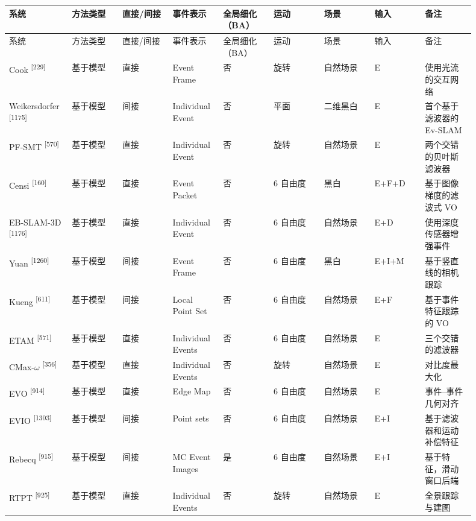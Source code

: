 \scriptsize
\setlength{\tabcolsep}{2pt}
\begin{longtable}{p{0.100\linewidth}p{0.100\linewidth}p{0.100\linewidth}p{0.100\linewidth}p{0.100\linewidth}p{0.100\linewidth}p{0.100\linewidth}p{0.100\linewidth}p{0.100\linewidth}}
\toprule
系统 & 方法类型 & 直接/间接 & 事件表示 & 全局细化（BA） & 运动 & 场景 & 输入 & 备注 \\
\midrule
\endfirsthead
\toprule
系统 & 方法类型 & 直接/间接 & 事件表示 & 全局细化（BA） & 运动 & 场景 & 输入 & 备注 \\
\midrule
\endhead
Cook \textsuperscript{[229]} & 基于模型 & 直接 & Event Frame & 否 & 旋转 & 自然场景 & E & 使用光流的交互网络 \\
Weikersdorfer \textsuperscript{[1175]} & 基于模型 & 间接 & Individual Event & 否 & 平面 & 二维黑白 & E & 首个基于滤波器的 Ev-SLAM \\
PF-SMT \textsuperscript{[570]} & 基于模型 & 直接 & Individual Event & 否 & 旋转 & 自然场景 & E & 两个交错的贝叶斯滤波器 \\
Censi \textsuperscript{[160]} & 基于模型 & 直接 & Event Packet & 否 & 6 自由度 & 黑白 & E+F+D & 基于图像梯度的滤波式 VO \\
EB-SLAM-3D \textsuperscript{[1176]} & 基于模型 & 直接 & Individual Event & 否 & 6 自由度 & 自然场景 & E+D & 使用深度传感器增强事件 \\
Yuan \textsuperscript{[1260]} & 基于模型 & 间接 & Event Frame & 否 & 6 自由度 & 黑白 & E+I+M & 基于竖直线的相机跟踪 \\
Kueng \textsuperscript{[611]} & 基于模型 & 间接 & Local Point Set & 否 & 6 自由度 & 自然场景 & E+F & 基于事件特征跟踪的 VO \\
ETAM \textsuperscript{[571]} & 基于模型 & 直接 & Individual Events & 否 & 6 自由度 & 自然场景 & E & 三个交错的滤波器 \\
CMax-$\omega$ \textsuperscript{[356]} & 基于模型 & 直接 & Individual Events & 否 & 旋转 & 自然场景 & E & 对比度最大化 \\
EVO \textsuperscript{[914]} & 基于模型 & 直接 & Edge Map & 否 & 6 自由度 & 自然场景 & E & 事件--事件几何对齐 \\
EVIO \textsuperscript{[1303]} & 基于模型 & 间接 & Point sets & 否 & 6 自由度 & 自然场景 & E+I & 基于滤波器和运动补偿特征 \\
Rebecq \textsuperscript{[915]} & 基于模型 & 间接 & MC Event Images & 是 & 6 自由度 & 自然场景 & E+I & 基于特征，滑动窗口后端 \\
RTPT \textsuperscript{[925]} & 基于模型 & 直接 & Individual Events & 否 & 旋转 & 自然场景 & E & 全景跟踪与建图 \\

\end{longtable}
